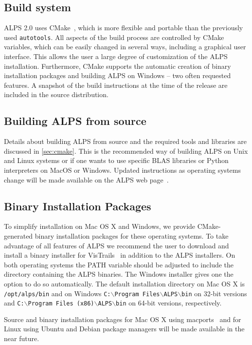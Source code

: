 \documentclass[12pt]{iopart}
\begin{document}
\subsection{Build system}
ALPS 2.0 uses CMake~\cite{cmake}, which is more flexible and portable than the previously used {\tt autotools}. All aspects of the build process are controlled by CMake variables, which can be easily changed in several ways, including a graphical user interface. This allows the user a large degree of customization of the ALPS installation. Furthermore, CMake supports the automatic creation of binary installation packages and building ALPS on Windows -- two often requested features. A snapshot of the build instructions at the time of the release are included in the source distribution. 
\subsection{Building ALPS from source}

Details about building ALPS from source and the required tools and libraries are discussed in \ref{sec:cmake}. This is the recommended way of building ALPS on Unix and Linux systems or if one wants to use specific BLAS libraries or Python interpreters on MacOS or Windows. Updated instructions as operating systems change will be made available on the ALPS web page~\cite{alps}.

\subsection{Binary Installation Packages}

To simplify installation on Mac OS X and Windows, we provide CMake-generated binary installation packages for these operating systems. To take advantage of all features of ALPS we recommend the user to download and install a binary installer for VisTrails~\cite{vistrails} in addition to the ALPS installers. On both operating systems the PATH variable should be adjusted to include the directory containing the ALPS binaries. The Windows installer gives one the option to do so automatically. The default installation directory on Mac OS X is {\tt /opt/alps/bin} and on Windows {\tt C:$\backslash$Program Files$\backslash$ALPS$\backslash$bin} on 32-bit versions and {\tt C:$\backslash$Program Files (x86)$\backslash$ALPS$\backslash$bin} on 64-bit versions, respectively.

Source and binary installation packages for Mac OS X using macports~\cite{macports} and for Linux using Ubuntu and Debian package managers will be made available in the near future.
\end{document}
